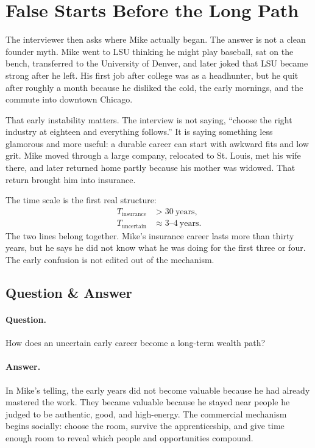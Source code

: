 \section{False Starts Before the Long Path}

The interviewer then asks where Mike actually began. The answer is not a clean founder myth. Mike went to LSU thinking he might play baseball, sat on the bench, transferred to the University of Denver, and later joked that LSU became strong after he left. His first job after college was as a headhunter, but he quit after roughly a month because he disliked the cold, the early mornings, and the commute into downtown Chicago.

That early instability matters. The interview is not saying, ``choose the right industry at eighteen and everything follows.'' It is saying something less glamorous and more useful: a durable career can start with awkward fits and low grit. Mike moved through a large company, relocated to St. Louis, met his wife there, and later returned home partly because his mother was widowed. That return brought him into insurance.

The time scale is the first real structure:
\begin{align}
T_{\text{insurance}} &> 30 \ \text{years},\\
T_{\text{uncertain}} &\approx 3\text{--}4 \ \text{years}.
\end{align}
The two lines belong together. Mike's insurance career lasts more than thirty years, but he says he did not know what he was doing for the first three or four. The early confusion is not edited out of the mechanism.

\subsection{Question \& Answer}

\paragraph{Question.}
How does an uncertain early career become a long-term wealth path?

\paragraph{Answer.}
In Mike's telling, the early years did not become valuable because he had already mastered the work. They became valuable because he stayed near people he judged to be authentic, good, and high-energy. The commercial mechanism begins socially: choose the room, survive the apprenticeship, and give time enough room to reveal which people and opportunities compound.

